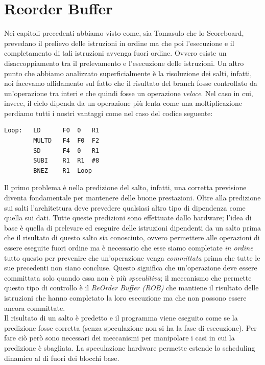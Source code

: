 \section{Reorder Buffer}\label{capitolo5}
Nei capitoli precedenti abbiamo visto come, sia Tomasulo che lo Scoreboard, prevedano il prelievo delle istruzioni in ordine ma che poi l'esecuzione e il completamento di tali istruzioni avvenga fuori ordine. Ovvero esiste un disaccoppiamento tra il prelevamento e l'esecuzione delle istruzioni. Un altro punto che abbiamo analizzato superficialmente è la risoluzione dei salti, infatti, noi facevamo affidamento sul fatto che il risultato del branch fosse controllato da un'operazione tra interi e che quindi fosse un operazione \emph{veloce}. Nel caso in cui, invece, il ciclo dipenda da un operazione più lenta come una moltiplicazione perdiamo tutti i nostri vantaggi come nel caso del codice seguente:
\begin{verbatim}
Loop:   LD      F0  0   R1
        MULTD   F4  F0  F2
        SD      F4  0   R1
        SUBI    R1  R1  #8
        BNEZ    R1  Loop
\end{verbatim}
Il primo problema è nella predizione del salto, infatti, una corretta previsione diventa fondamentale per mantenere delle buone prestazioni. Oltre alla predizione sui salti l'architettura deve prevedere qualsiasi altro tipo di dipendenza come quella sui dati. Tutte queste predizioni sono effettuate dallo hardware; l'idea di base è quella di prelevare ed eseguire delle istruzioni dipendenti da un salto prima che il risultato di questo salto sia conosciuto, ovvero permettere alle operazioni di essere eseguite fuori ordine ma è necessario che esse siamo completate \emph{in ordine} tutto questo per prevenire che un'operazione venga \emph{committata} prima che tutte le sue precedenti non siano concluse. Questo significa che un'operazione deve essere committata solo quando essa non è più \emph{speculitiva}; il meccanismo che permette questo tipo di controllo è il \emph{ReOrder Buffer (ROB)} che mantiene il risultato delle istruzioni che hanno completato la loro esecuzione ma che non possono essere ancora committate.\\
Il risultato di un salto è predetto e il programma viene eseguito come se la predizione fosse corretta (senza speculazione non si ha la fase di esecuzione). Per fare ciò però sono necessari dei meccanismi per manipolare i casi in cui la predizione è sbagliata. La speculazione hardware permette estende lo scheduling dinamico al di fuori dei blocchi base.\\
